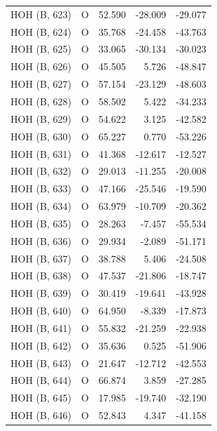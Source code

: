 \begin{longtable}{@{}lcrr@{}}
  \cmidrule(r){1-5}
  HOH (B, 623) & O & 52.590 & -28.009 & -29.077 \\
  \cmidrule(r){1-5}
  HOH (B, 624) & O & 35.768 & -24.458 & -43.763 \\
  \cmidrule(r){1-5}
  HOH (B, 625) & O & 33.065 & -30.134 & -30.023 \\
  \cmidrule(r){1-5}
  HOH (B, 626) & O & 45.505 & 5.726 & -48.847 \\
  \cmidrule(r){1-5}
  HOH (B, 627) & O & 57.154 & -23.129 & -48.603 \\
  \cmidrule(r){1-5}
  HOH (B, 628) & O & 58.502 & 5.422 & -34.233 \\
  \cmidrule(r){1-5}
  HOH (B, 629) & O & 54.622 & 3.125 & -42.582 \\
  \cmidrule(r){1-5}
  HOH (B, 630) & O & 65.227 & 0.770 & -53.226 \\
  \cmidrule(r){1-5}
  HOH (B, 631) & O & 41.368 & -12.617 & -12.527 \\
  \cmidrule(r){1-5}
  HOH (B, 632) & O & 29.013 & -11.255 & -20.008 \\
  \cmidrule(r){1-5}
  HOH (B, 633) & O & 47.166 & -25.546 & -19.590 \\
  \cmidrule(r){1-5}
  HOH (B, 634) & O & 63.979 & -10.709 & -20.362 \\
  \cmidrule(r){1-5}
  HOH (B, 635) & O & 28.263 & -7.457 & -55.534 \\
  \cmidrule(r){1-5}
  HOH (B, 636) & O & 29.934 & -2.089 & -51.171 \\
  \cmidrule(r){1-5}
  HOH (B, 637) & O & 38.788 & 5.406 & -24.508 \\
  \cmidrule(r){1-5}
  HOH (B, 638) & O & 47.537 & -21.806 & -18.747 \\
  \cmidrule(r){1-5}
  HOH (B, 639) & O & 30.419 & -19.641 & -43.928 \\
  \cmidrule(r){1-5}
  HOH (B, 640) & O & 64.950 & -8.339 & -17.873 \\
  \cmidrule(r){1-5}
  HOH (B, 641) & O & 55.832 & -21.259 & -22.938 \\
  \cmidrule(r){1-5}
  HOH (B, 642) & O & 35.636 & 0.525 & -51.906 \\
  \cmidrule(r){1-5}
  HOH (B, 643) & O & 21.647 & -12.712 & -42.553 \\
  \cmidrule(r){1-5}
  HOH (B, 644) & O & 66.874 & 3.859 & -27.285 \\
  \cmidrule(r){1-5}
  HOH (B, 645) & O & 17.985 & -19.740 & -32.190 \\
  \cmidrule(r){1-5}
  HOH (B, 646) & O & 52.843 & 4.347 & -41.158 \\

\end{longtable}
